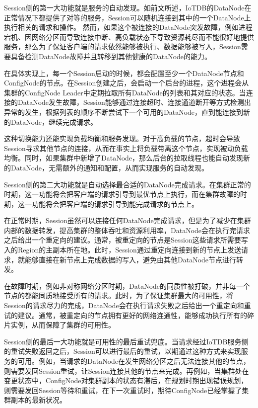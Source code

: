 Session侧的第一大功能就是服务的自动发现。如前文所述，IoTDB的DataNode在正常情况下都提供了对等的服务，Session可以随机连接到其中的一个DataNode上执行相关的请求和操作。
然而，如果这个被连接的DataNode突发故障，例如进程宕机、因网络分区而导致连接中断、高负载状态下导致资源耗尽而不能很好地提供服务，那么为了保证客户端的请求依然能够被执行、数据能够被写入，Session需要具备检测DataNode故障并且转移到其他健康的DataNode的能力。


在具体实现上，每一个Session启动的时候，都会配置至少一个DataNode节点和ConfigNode的节点。在Session创建之后，会启动一个后台的进程，这个进程会从集群的ConfigNode Leader中定期拉取所有DataNode的列表和其对应的状态。当连接的DataNode发生故障，Session能够通过连接超时、连接通道断开等方式检测出异常的发生，根据列表的顺序不断尝试下一个可用的DataNode，直到能连接到新的DataNode，继续完成请求。


这种切换能力还能实现负载均衡和服务发现。对于高负载的节点，超时会导致Session寻求其他节点的连接，从而在事实上将负载带离这个节点，实现被动负载均衡。同时，如果集群中新增了DataNode，那么后台的拉取线程也能自动发现新的DataNode，无需额外的通知和配置，从而实现服务的自动发现。


Session侧的第二大功能就是自动选择最合适的DataNode完成请求。在集群正常的时期，这一功能将会把客户端的请求引导到最优节点上执行，而在集群故障的时期，这一功能将会把客户端的请求引导到能完成请求的节点上。

在正常时期，Session虽然可以连接任何DataNode完成请求，但是为了减少在集群内部的数据转发，提高集群的整体吞吐和资源利用率，DataNode会在执行完请求之后给出一个重定向的建议。通常，被重定向的节点是Session这些请求所需要写入的Region的主副本所在地。此时，Session通过重定向连接到新的节点上发送请求，就能够直接在新节点上完成数据的写入，避免由其他DataNode节点进行转发。

在故障时期，例如非对称网络分区时期，DataNode的同质性被打破，并非每一个节点的都能同质地接受所有的请求。此时，为了保证集群最大的可用性，将Session的请求尽力的完成，DataNode会在执行请求失败之后给出一个重定向和重试的建议。通常，被重定向的节点拥有更好的网络连通性，能够成功执行所有的碎片实例，从而保障了集群的可用性。

Session侧的最后一大功能就是可用性的最后重试兜底。当请求经过IoTDB服务侧的重试失败返回之后，Session可以进行最后的重试，以期通过这种方式来实现服务的可用。例如，当请求的DataNode在发生网络分区之后无法连接其他的节点，则需要发回Session重试，让Session连接其他的节点来完成。再例如，当集群处在变更状态中，ConfigNode对集群副本的状态有滞后，在规划时期出现错误规划，则需要发回Session等待和重试，在下一次重试时，期待ConfigNode已经掌握了集群副本的最新状况。




